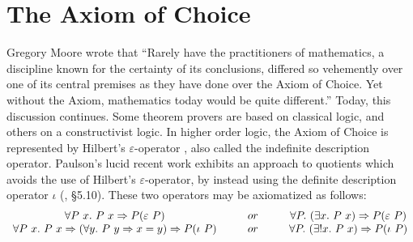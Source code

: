 \documentclass[envcountsame,runningheads]{llncs}
\begin{document}
%
\section{The Axiom of Choice}
%
\label{axiomofchoice}

Gregory Moore wrote that ``Rarely have the practitioners of mathematics,
a discipline known for the certainty of its conclusions, differed so vehemently
over one of its central premises as they have done over the Axiom of Choice.
Yet without the Axiom, mathematics today would be quite different.''
\cite{Moore82}
Today,
this discussion continues.
Some theorem provers are based on classical logic,
and others on
a constructivist logic.
In higher order logic, the Axiom of Choice is represented
by Hilbert's $\varepsilon$-operator \cite{Lei69},
also called the indefinite description 
operator.
  Paulson's lucid recent work \cite{LP04} exhibits an approach to quotients
which avoids the use of Hilbert's $\varepsilon$-operator,
by
instead
using the definite description operator $\iota$
(\cite{NiPaWe02}, \S 5.10).
These two operators may be axiomatized as
follows:
%
$$\begin{array}{cp{3mm}cp{3mm}c}
\forall P\ x.\ P\ x \Rightarrow P (\varepsilon \ P) & & or & &
\forall P.\ (\exists x.\ P\ x) \Rightarrow P (\varepsilon \ P)
\\
\forall P\ x.\ P\ x \Rightarrow (\forall y.\ P\ y \Rightarrow x = y) \Rightarrow P (\iota \ P) & & or & &
\forall P.\ (\exists ! x.\ P\ x) \Rightarrow P (\iota \ P)
\end{array}
$$
\end{document}
